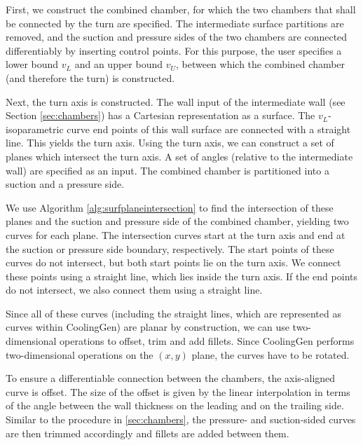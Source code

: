 \documentclass[a4paper, 11pt]{report}
\theoremstyle{definition}
\begin{document}
	First, we construct the combined chamber, for which the two chambers that shall be connected by the turn are specified. The intermediate surface partitions are removed, and the suction and pressure sides of the two chambers are connected differentiably by inserting control points. For this purpose, the user specifies a lower bound $v_L$ and an upper bound $v_U$, between which the combined chamber (and therefore the turn) is constructed.

	Next, the turn axis is constructed. The wall input of the intermediate wall (see Section \ref{sec:chambers}) has a Cartesian representation as a surface. The $v_L$-isoparametric curve end points of this wall surface are connected with a straight line. This yields the turn axis. Using the turn axis, we can construct a set of planes which intersect the turn axis. A set of angles (relative to the intermediate wall) are specified as an input. The combined chamber is partitioned into a suction and a pressure side.

	We use Algorithm \ref{alg:surfplaneintersection} to find the intersection of these planes and the suction and pressure side of the combined chamber, yielding two curves for each plane. The intersection curves start at the turn axis and end at the suction or pressure side boundary, respectively. The start points of these curves do not intersect, but both start points lie on the turn axis. We connect these points using a straight line, which lies inside the turn axis. If the end points do not intersect, we also connect them using a straight line.

	Since all of these curves (including the straight lines, which are represented as curves within CoolingGen) are planar by construction, we can use two-dimensional operations to offset, trim and add fillets. Since CoolingGen performs two-dimensional operations on the $(x,y)$ plane, the curves have to be rotated.

	To ensure a differentiable connection between the chambers, the axis-aligned curve is offset. The size of the offset is given by the linear interpolation in terms of the angle between the wall thickness on the leading and on the trailing side. Similar to the procedure in \ref{sec:chambers}, the pressure- and suction-sided curves are then trimmed accordingly and fillets are added between them.
\end{document}
